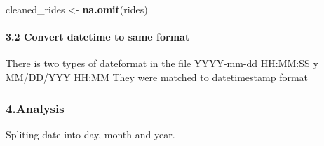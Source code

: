 \documentclass[
]{article}
\newenvironment{Shaded}{\begin{snugshade}}{\end{snugshade}}
\newcommand{\AttributeTok}[1]{\textcolor[rgb]{0.13,0.29,0.53}{#1}}
\newcommand{\DecValTok}[1]{\textcolor[rgb]{0.00,0.00,0.81}{#1}}
\newcommand{\FunctionTok}[1]{\textcolor[rgb]{0.13,0.29,0.53}{\textbf{#1}}}
\newcommand{\NormalTok}[1]{#1}
\newcommand{\OtherTok}[1]{\textcolor[rgb]{0.56,0.35,0.01}{#1}}
\newcommand{\SpecialCharTok}[1]{\textcolor[rgb]{0.81,0.36,0.00}{\textbf{#1}}}
\newcommand{\StringTok}[1]{\textcolor[rgb]{0.31,0.60,0.02}{#1}}
\begin{document}
\begin{Shaded}
\begin{Highlighting}[]
\NormalTok{cleaned\_rides }\OtherTok{\textless{}{-}} \FunctionTok{na.omit}\NormalTok{(rides)}
\end{Highlighting}
\end{Shaded}

\hypertarget{convert-datetime-to-same-format}{%
\paragraph{3.2 Convert datetime to same
format}\label{convert-datetime-to-same-format}}

There is two types of dateformat in the file YYYY-mm-dd HH:MM:SS y
MM/DD/YYY HH:MM They were matched to datetimestamp format

\hypertarget{analysis}{%
\subsubsection{4.Analysis}\label{analysis}}

Spliting date into day, month and year.

\begin{Shaded}
\end{Shaded}
\end{document}
